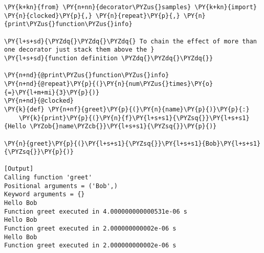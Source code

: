 \begin{Verbatim}[label=\makebox{\url{https://github.com/lucabaldini/cmepda/tree/master/slides/latex/snippets/decorator\_chain.py}},commandchars=\\\{\}]
\PY{k+kn}{from} \PY{n+nn}{decorator\PYZus{}samples} \PY{k+kn}{import} \PY{n}{clocked}\PY{p}{,} \PY{n}{repeat}\PY{p}{,} \PY{n}{print\PYZus{}function\PYZus{}info}

\PY{l+s+sd}{\PYZdq{}\PYZdq{}\PYZdq{} To chain the effect of more than one decorator just stack them above the }
\PY{l+s+sd}{function definition \PYZdq{}\PYZdq{}\PYZdq{}}

\PY{n+nd}{@print\PYZus{}function\PYZus{}info}
\PY{n+nd}{@repeat}\PY{p}{(}\PY{n}{num\PYZus{}times}\PY{o}{=}\PY{l+m+mi}{3}\PY{p}{)}
\PY{n+nd}{@clocked}
\PY{k}{def} \PY{n+nf}{greet}\PY{p}{(}\PY{n}{name}\PY{p}{)}\PY{p}{:}
    \PY{k}{print}\PY{p}{(}\PY{n}{f}\PY{l+s+s1}{\PYZsq{}}\PY{l+s+s1}{Hello \PYZob{}name\PYZcb{}}\PY{l+s+s1}{\PYZsq{}}\PY{p}{)}
    
\PY{n}{greet}\PY{p}{(}\PY{l+s+s1}{\PYZsq{}}\PY{l+s+s1}{Bob}\PY{l+s+s1}{\PYZsq{}}\PY{p}{)}

[Output]
Calling function 'greet'
Positional arguments = ('Bob',)
Keyword arguments = {}
Hello Bob
Function greet executed in 4.000000000000531e-06 s
Hello Bob
Function greet executed in 2.000000000002e-06 s
Hello Bob
Function greet executed in 2.000000000002e-06 s
\end{Verbatim}